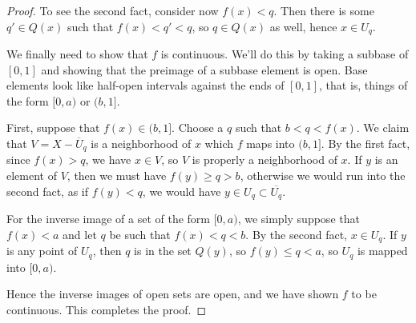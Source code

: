 \begin{proof}
To see the second fact, consider now $f(x)<q$.  Then there is some $q'\in Q(x)$ such that $f(x)<q'<q$, so $q\in Q(x)$ as well, hence $x\in U_q$.

We finally need to show that $f$ is continuous.  We'll do this by taking a subbase of $[0,1]$ and showing that the preimage of a subbase element is open.  Base elements look like half-open intervals against the ends of $[0,1]$, that is, things of the form $[0,a)$ or $(b,1]$.

First, suppose that $f(x)\in (b,1]$.  Choose a $q$ such that $b<q<f(x)$.  We claim that $V=X{-}\overline{U}_q$ is a neighborhood of $x$ which $f$ maps into $(b,1]$.  By the first fact, since $f(x)>q$, we have $x\in V$, so $V$ is properly a neighborhood of $x$.  If $y$ is an element of $V$, then we must have $f(y)\geq q > b$, otherwise we would run into the second fact, as if $f(y)<q$, we would have $y\in U_q\subset \overline{U_q}$.

For the inverse image of a set of the form $[0,a)$, we simply suppose that $f(x)<a$ and let $q$ be such that $f(x)<q<b$.  By the second fact, $x\in U_q$.  If $y$ is any point of $U_q$, then $q$ is in the set $Q(y)$, so $f(y)\leq q < a$, so $U_q$ is mapped into $[0,a)$.

Hence the inverse images of open sets are open, and we have shown $f$ to be continuous.  This completes the proof.



	
\end{proof}
	